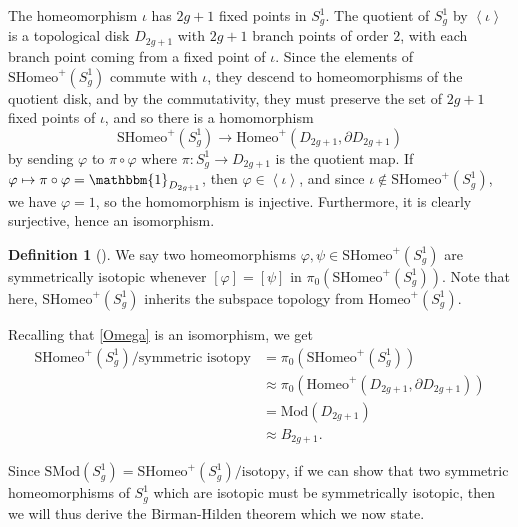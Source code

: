 \documentclass[reqno]{amsart}
\theoremstyle{definition}
\newtheorem{definition}[theorem]{Definition}
\theoremstyle{remark}
\newcommand{\Mod}{{\mathrm{Mod}}}
\newcommand{\SMod}{{\mathrm{SMod}}}
\newcommand{\Homeo}{{\mathrm{Homeo}}}
\newcommand{\SHomeo}{{\mathrm{SHomeo}}}
\begin{document}
 The homeomorphism $\iota$ has
  $2g+1$ fixed points in
   $S_g^{1}$. The quotient of
   $S_g^{1}$ by $\left<\iota \right>$ is
   a topological disk
   $D_{2g+1}$ with $2g+1$ branch points of order
   $2$, with each branch point coming from a fixed point of $\iota$.
   Since the elements of  $\SHomeo^{+} \left( S_g^{1} \right) $ 
   commute with $\iota$, they descend to homeomorphisms
   of the quotient disk, and by the commutativity, they
   must preserve the set of  $2g+1$ fixed points of $\iota$,
   and so there is a homomorphism
    \[
   \SHomeo^{+} \left( S_g^{1} \right) 
   \to \Homeo^{+} \left( D_{2g+1}, \partial D_{2g+1} \right) 
   \label{Omega} \tag{$\Omega$}
   \] 
   by sending
   $\varphi $ to
   $\pi \circ \varphi $ where
   $\pi \colon S_g^{1} \to 
   D_{2g+1}$ is the quotient map. If
   $\varphi  \mapsto \pi \circ \varphi  = \mathbbm{1}_{
   D_{2g+1}}$, then $\varphi  
   \in \left<\iota \right>$, and since $\iota 
   \not\in \SHomeo^{+} \left( S_g^{1} \right) $, we have
   $\varphi  = 1$, so
   the homomorphism is injective. Furthermore, it
   is clearly surjective, hence an isomorphism.
   



   \begin{definition}[]
       We say two homeomorphisms
       $\varphi , \psi \in \SHomeo^{+}\left( S_g^{1} \right) $ 
       are symmetrically isotopic whenever
       $\left[ \varphi  \right] =
       \left[ \psi \right] $ in
       $\pi_0 \left( \SHomeo^{+}\left( S_g^{1} \right)  \right) $.
       Note that here,
       $\SHomeo^{+} \left( S_g^{1} \right) $ inherits
       the subspace topology from
       $\Homeo^{+} \left( S_{g}^{1} \right) $.
   \end{definition}

   Recalling that \eqref{Omega} is an isomorphism, we
   get
   \begin{align*}
       \SHomeo^{+} \left( S_g^{1} \right) /
       \text{symmetric isotopy}
       &= \pi_0 \left( \SHomeo^{+}(S_g^{1}) \right) \\
       &\approx \pi_0 \left( \Homeo^{+} \left( 
       D_{2g+1}, \partial D_{2g+1} \right)  \right) \\
       &= \Mod \left( D_{2g+1} \right) \\
       &\approx B_{2g+1}.
   \end{align*}
   
   Since
   $\SMod \left( S_g^{1} \right) 
   = \SHomeo^{+} \left( S_g^{1} \right) 
   / \text{isotopy}$,
   if we can show that 
   two symmetric homeomorphisms of $S_{g}^{1}$ which are
   isotopic must be symmetrically isotopic, then
   we will thus derive the Birman-Hilden theorem which we now state.
\end{document}

